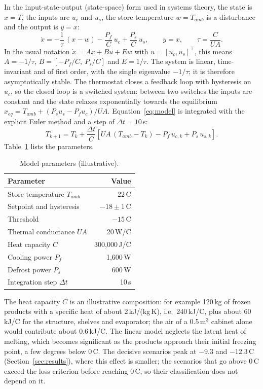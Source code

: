\documentclass{ceurart}
\newcommand{\degC}{\,\textdegree{}C}
\begin{document}
In the input-state-output (state-space) form used in systems theory, the state is $x = T$, the inputs are $u_c$ and $u_s$, the store temperature $w = T_{amb}$ is a disturbance and the output is $y = x$:
\begin{equation}
  \dot{x} = -\frac{1}{\tau}\,(x - w) - \frac{P_f}{C}\,u_c + \frac{P_s}{C}\,u_s, \qquad y = x, \qquad \tau = \frac{C}{UA}.
  \label{eq:ss}
\end{equation}
In the usual notation $\dot{x} = Ax + Bu + Ew$ with $u = [u_c, u_s]^\top$, this means $A = -1/\tau$, $B = [-P_f/C,\ P_s/C]$ and $E = 1/\tau$.
The system is linear, time-invariant and of first order, with the single eigenvalue $-1/\tau$; it is therefore asymptotically stable.
The thermostat closes a feedback loop with hysteresis on $u_c$, so the closed loop is a switched system: between two switches the inputs are constant and the state relaxes exponentially towards the equilibrium $x_{eq} = T_{amb} + (P_s u_s - P_f u_c)/UA$.
Equation~\eqref{eq:model} is integrated with the explicit Euler method and a step of $\Delta t = 10$\,s:
\begin{equation}
  T_{k+1} = T_k + \frac{\Delta t}{C}\left[ UA\,(T_{amb} - T_k) - P_f\,u_{c,k} + P_s\,u_{s,k} \right].
\end{equation}
Table~\ref{tab:parameters} lists the parameters.

\begin{table}[ht]
  \caption{Model parameters (illustrative).}
  \label{tab:parameters}
  \begin{tabular}{@{}lr@{}}
    \toprule
    Parameter & Value \\
    \midrule
    Store temperature $T_{amb}$ & 22\degC \\
    Setpoint and hysteresis & $-18 \pm 1$\degC \\
    Threshold & $-15$\degC \\
    Thermal conductance $UA$ & 20\,W/\textdegree{}C \\
    Heat capacity $C$ & 300{,}000\,J/\textdegree{}C \\
    Cooling power $P_f$ & 1{,}600\,W \\
    Defrost power $P_s$ & 600\,W \\
    Integration step $\Delta t$ & 10\,s \\
    \bottomrule
  \end{tabular}
\end{table}

The heat capacity $C$ is an illustrative composition: for example 120\,kg of frozen products with a specific heat of about 2\,kJ/(kg\,K), i.e.\ 240\,kJ/\textdegree{}C, plus about 60\,kJ/\textdegree{}C for the structure, shelves and evaporator; the air of a 0.5\,m$^3$ cabinet alone would contribute about 0.6\,kJ/\textdegree{}C.
The linear model neglects the latent heat of melting, which becomes significant as the products approach their initial freezing point, a few degrees below 0\degC.
The decisive scenarios peak at $-9.3$ and $-12.3$\degC{} (Section~\ref{sec:results}), where this effect is smaller; the scenarios that go above 0\degC{} exceed the loss criterion before reaching 0\degC, so their classification does not depend on it.
\end{document}
